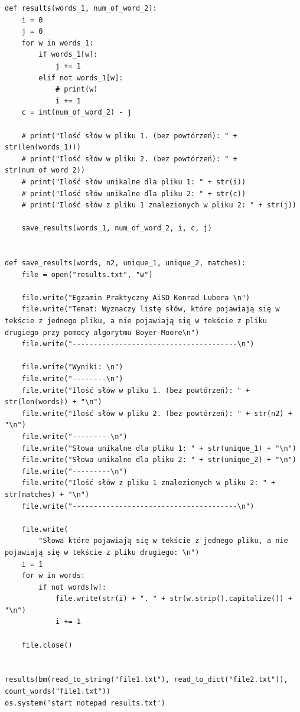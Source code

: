 \documentclass[12pt,a4paper]{article}
\begin{document}
\begin{lstlisting}
def results(words_1, num_of_word_2):
    i = 0
    j = 0
    for w in words_1:
        if words_1[w]:
            j += 1
        elif not words_1[w]:
            # print(w)
            i += 1
    c = int(num_of_word_2) - j

    # print("Ilość słów w pliku 1. (bez powtórzeń): " + str(len(words_1)))
    # print("Ilość słów w pliku 2. (bez powtórzeń): " + str(num_of_word_2))
    # print("Ilość słów unikalne dla pliku 1: " + str(i))
    # print("Ilość słów unikalne dla pliku 2: " + str(c))
    # print("Ilość słów z pliku 1 znalezionych w pliku 2: " + str(j))

    save_results(words_1, num_of_word_2, i, c, j)


def save_results(words, n2, unique_1, unique_2, matches):
    file = open("results.txt", "w")

    file.write("Egzamin Praktyczny AiSD Konrad Lubera \n")
    file.write("Temat: Wyznaczy listę słów, które pojawiają się w tekście z jednego pliku, a nie pojawiają się w tekście z pliku drugiego przy pomocy algorytmu Boyer-Moore\n")
    file.write("---------------------------------------\n")

    file.write("Wyniki: \n")
    file.write("--------\n")
    file.write("Ilość słów w pliku 1. (bez powtórzeń): " + str(len(words)) + "\n")
    file.write("Ilość słów w pliku 2. (bez powtórzeń): " + str(n2) + "\n")
    file.write("---------\n")
    file.write("Słowa unikalne dla pliku 1: " + str(unique_1) + "\n")
    file.write("Słowa unikalne dla pliku 2: " + str(unique_2) + "\n")
    file.write("---------\n")
    file.write("Ilość słów z pliku 1 znalezionych w pliku 2: " + str(matches) + "\n")
    file.write("---------------------------------------\n")

    file.write(
        "Słowa które pojawiają się w tekście z jednego pliku, a nie pojawiają się w tekście z pliku drugiego: \n")
    i = 1
    for w in words:
        if not words[w]:
            file.write(str(i) + ". " + str(w.strip().capitalize()) + "\n")
            i += 1

    file.close()


results(bm(read_to_string("file1.txt"), read_to_dict("file2.txt")), count_words("file1.txt"))
os.system('start notepad results.txt')

\end{lstlisting}
\end{document}
